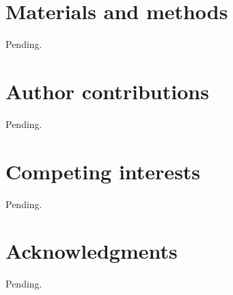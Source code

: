 \documentclass[11pt]{article}
\begin{document}
\section{Materials and methods}
Pending.

\section{Author contributions}
Pending.

\section{Competing interests}
Pending.


\section{Acknowledgments}
Pending.



%

\end{document}
